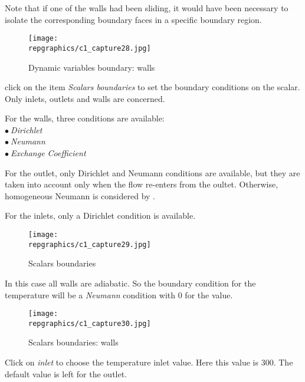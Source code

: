 Note that if one of the walls had been sliding, it would have been necessary to
isolate the corresponding boundary faces in a specific boundary region.

\begin{figure}[ht]
\begin{center}
\texttt{[image: \\repgraphics/c1\_capture28.jpg]}
\caption{Dynamic variables boundary: walls}
\label{fig28_e1}
\end{center}
\end{figure}


\clearpage
click on the item {\itshape Scalars boundaries} to set the boundary conditions
on the scalar. Only inlets, outlets and walls are concerned.

For the walls, three conditions are available:\\
\hspace*{1cm}$\bullet\ ${\itshape Dirichlet}\\
\hspace*{1cm}$\bullet\ ${\itshape Neumann}\\
\hspace*{1cm}$\bullet\ ${\itshape Exchange Coefficient}

For the outlet, only Dirichlet and Neumann conditions are available, but they are
taken into account only when the flow re-enters from the oultet. Otherwise,
homogeneous Neumann is considered by \CS.

For the inlets, only a Dirichlet condition is available.

\begin{figure}[ht]
\begin{center}
\texttt{[image: \\repgraphics/c1\_capture29.jpg]}
\caption{Scalars boundaries}
\label{fig29_e1}
\end{center}
\end{figure}


\clearpage
In this case all walls are adiabatic. So the boundary condition for the
temperature will be a {\itshape Neumann} condition with 0 for the value.
\begin{figure}[ht]
\begin{center}
\texttt{[image: \\repgraphics/c1\_capture30.jpg]}
\caption{Scalars boundaries: walls}
\label{fig30_e1}
\end{center}
\end{figure}


\clearpage
Click on {\itshape inlet} to choose the temperature inlet
value. Here this value is 300\degresC.
The default value is left for the outlet.

